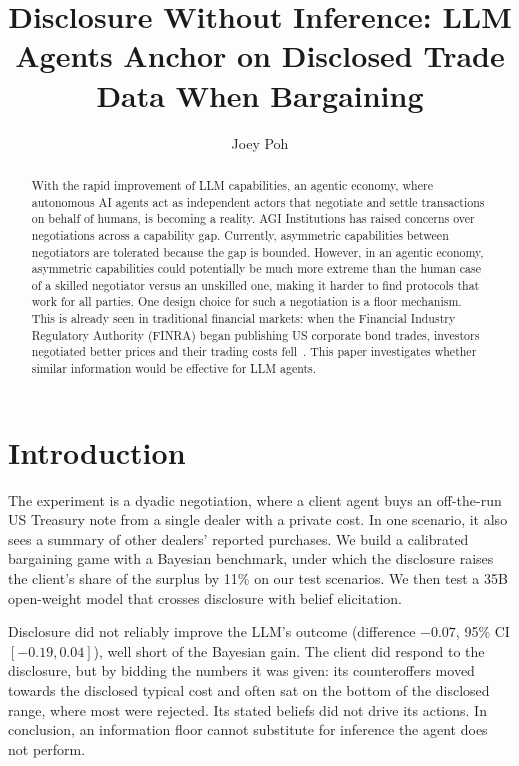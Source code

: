 \documentclass[sigconf]{acmart}
\begin{document}
\title{Disclosure Without Inference: LLM Agents Anchor on Disclosed Trade Data When Bargaining}

\author{Joey Poh}

\begin{abstract}
With the rapid improvement of LLM capabilities, an agentic economy, where autonomous AI agents act as independent actors that negotiate and settle transactions on behalf of humans, is becoming a reality. AGI Institutions has raised concerns over negotiations across a capability gap. %
Currently, asymmetric capabilities between negotiators are tolerated because the gap is bounded. However, in an agentic economy, asymmetric capabilities could potentially be much more extreme than the human case of a skilled negotiator versus an unskilled one, making it harder to find protocols that work for all parties. One design choice for such a negotiation is a floor mechanism. This is already seen in traditional financial markets: when the Financial Industry Regulatory Authority (FINRA) began publishing US corporate bond trades, investors negotiated better prices and their trading costs fell~\cite{goldstein2007transparency}. This paper investigates whether similar information would be effective for LLM agents.
\end{abstract}

\maketitle

\section{Introduction}

The experiment is a dyadic negotiation, where a client agent buys an off-the-run US Treasury note from a single dealer with a private cost. In one scenario, it also sees a summary of other dealers' reported purchases. We build a calibrated bargaining game with a Bayesian benchmark, under which the disclosure raises the client's share of the surplus by 11\% on our test scenarios. We then test a 35B open-weight model that crosses disclosure with belief elicitation.

Disclosure did not reliably improve the LLM's outcome (difference $-0.07$, 95\% CI $[-0.19, 0.04]$), well short of the Bayesian gain. The client did respond to the disclosure, but by bidding the numbers it was given: its counteroffers moved towards the disclosed typical cost and often sat on the bottom of the disclosed range, where most were rejected. Its stated beliefs did not drive its actions. In conclusion, an information floor cannot substitute for inference the agent does not perform.
\end{document}
